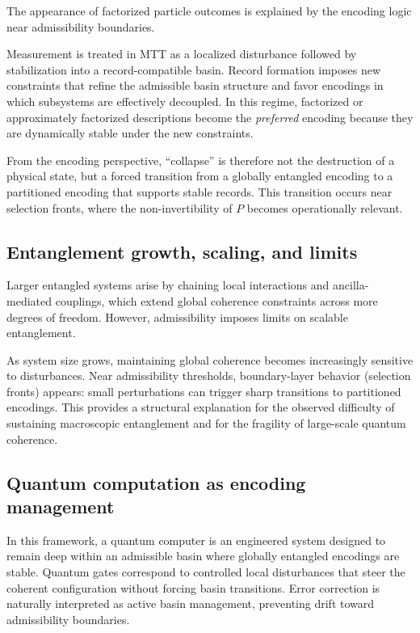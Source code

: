 \documentclass[11pt]{article}
\begin{document}
The appearance of factorized particle outcomes is explained by the encoding logic near
admissibility boundaries.

Measurement is treated in MTT as a localized disturbance followed by stabilization into a
record-compatible basin. Record formation imposes new constraints that refine the admissible
basin structure and favor encodings in which subsystems are effectively decoupled. In this
regime, factorized or approximately factorized descriptions become the \emph{preferred}
encoding because they are dynamically stable under the new constraints.

From the encoding perspective, ``collapse'' is therefore not the destruction of a physical
state, but a forced transition from a globally entangled encoding to a partitioned encoding
that supports stable records. This transition occurs near selection fronts, where the
non-invertibility of $P$ becomes operationally relevant.

\subsection{Entanglement growth, scaling, and limits}
\label{sec:ent_scaling}

Larger entangled systems arise by chaining local interactions and ancilla-mediated couplings,
which extend global coherence constraints across more degrees of freedom. However, admissibility
imposes limits on scalable entanglement.

As system size grows, maintaining global coherence becomes increasingly sensitive to
disturbances. Near admissibility thresholds, boundary-layer behavior (selection fronts)
appears: small perturbations can trigger sharp transitions to partitioned encodings. This
provides a structural explanation for the observed difficulty of sustaining macroscopic
entanglement and for the fragility of large-scale quantum coherence.

\subsection{Quantum computation as encoding management}
\label{sec:qc_encoding}

In this framework, a quantum computer is an engineered system designed to remain deep within
an admissible basin where globally entangled encodings are stable. Quantum gates correspond to
controlled local disturbances that steer the coherent configuration without forcing basin
transitions. Error correction is naturally interpreted as active basin management, preventing
drift toward admissibility boundaries.
\end{document}
